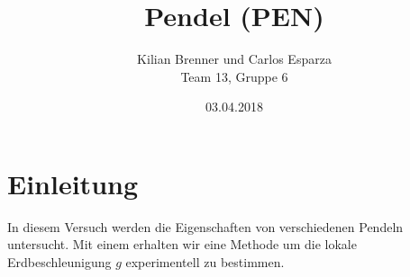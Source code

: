 \documentclass[12pt,a4paper]{article}
\title{Pendel (PEN)}
\author{Kilian Brenner und Carlos Esparza \\ Team 13, Gruppe 6}
\date{03.04.2018}
\begin{document}
\maketitle
\tableofcontents
\newpage
\section{Einleitung}
In diesem Versuch werden die Eigenschaften von verschiedenen Pendeln untersucht. Mit einem erhalten wir eine Methode um die lokale Erdbeschleunigung $g$ experimentell zu bestimmen. 










%
\end{document}
